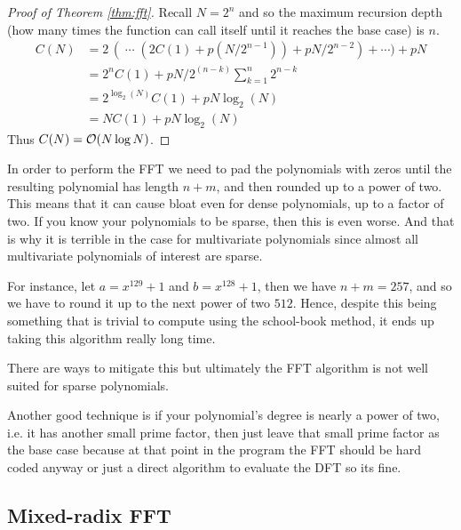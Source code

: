 

\begin{proof}[Proof of Theorem \ref{thm:fft}]
    Recall $N = 2^n$ and so the maximum recursion depth (how many times the function can call itself until it reaches the base case) is $n$.
    \begin{align*}
    C(N) &= 2\,(\;\cdots\; (2C(1) + p(N/2^{n-1})) + pN/2^{n-2}) + \cdots ) + pN\\
         &= 2^{n}C(1) + pN/2^{(n-k)}\sum^n_{k=1} 2^{n-k}\\
         &= 2^{\log_2(N)}C(1) + pN\log_2(N)\\
         &= NC(1) + pN\log_2(N)
    \end{align*}
    Thus $C(N) = \mathcal O(N \log N)$.
\end{proof}

\begin{remark}
    In order to perform the FFT we need to pad the polynomials with zeros until the resulting polynomial has length $n + m$, and then rounded up to a power of two. This means that it can cause bloat even for dense polynomials, up to a factor of two. If you know your polynomials to be sparse, then this is even worse. And that is why it is terrible in the case for multivariate polynomials since almost all multivariate polynomials of interest are sparse.

    For instance, let $a = x^{129} + 1$ and $b = x^{128} + 1$, then we have $n + m = 257$, and so we have to round it up to the next power of two $512$. Hence, despite this being something that is trivial to compute using the school-book method, it ends up taking this algorithm really long time.

    There are ways to mitigate this but ultimately the FFT algorithm is not well suited for sparse polynomials.

    Another good technique is if your polynomial's degree is nearly a power of two, i.e. it has another small prime factor, then just leave that small prime factor as the base case because at that point in the program the FFT should be hard coded anyway or just a direct algorithm to evaluate the DFT so its fine.

\end{remark}

\subsection{Mixed-radix FFT}

